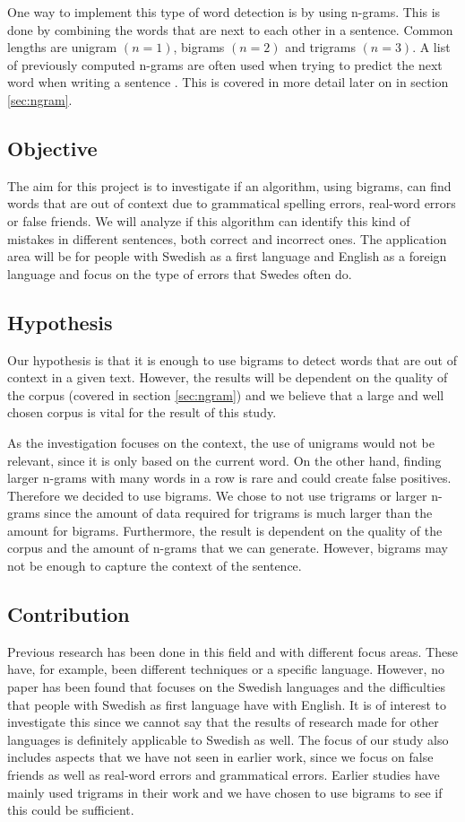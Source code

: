 \documentclass[a4paper,12pt]{article}
\begin{document}
One way to implement this type of word detection is by using n-grams. This is done by combining the words that are next to each other in a sentence. Common lengths are unigram $(n=1)$, bigrams $(n=2)$ and trigrams $(n=3)$. A list of previously computed n-grams are often used when trying to predict the next word when writing a sentence \cite{gallagher2004natural}. This is covered in more detail later on in section \ref{sec:ngram}.

\subsection{Objective}
\label{sec:objective}
The aim for this project is to investigate if an algorithm, using bigrams, can find words that are out of context due to grammatical spelling errors, real-word errors or false friends. We will analyze if this algorithm can identify this kind of mistakes in different sentences, both correct and incorrect ones. The application area will be for people with Swedish as a first language and English as a foreign language and focus on the type of errors that Swedes often do. 

\subsection{Hypothesis}
Our hypothesis is that it is enough to use bigrams to detect words that are out of context in a given text. However, the results will be dependent on the quality of the corpus (covered in section \ref{sec:ngram}) and we believe that a large and well chosen corpus is vital for the result of this study.

As the investigation focuses on the context, the use of unigrams would not be relevant, since it is only based on the current word. On the other hand, finding larger n-grams with many words in a row is rare and could create false positives. Therefore we decided to use bigrams. We chose to not use trigrams or larger n-grams since the amount of data required for trigrams is much larger than the amount for bigrams. Furthermore, the result is dependent on the quality of the corpus and the amount of n-grams that we can generate. However, bigrams may not be enough to capture the context of the sentence. 

\subsection{Contribution}
\label{sec:contribution}
Previous research has been done in this field and with different focus areas. These have, for example, been different techniques or a specific language. However, no paper has been found that focuses on the Swedish languages and the difficulties that people with Swedish as first language have with English. It is of interest to investigate this since we cannot say that the results of research made for other languages is definitely applicable to Swedish as well. The focus of our study also includes aspects that we have not seen in earlier work, since we focus on false friends as well as real-word errors and grammatical errors. Earlier studies have mainly used trigrams in their work and we have chosen to use bigrams to see if this could be sufficient. 
\end{document}
